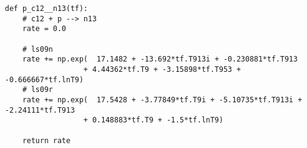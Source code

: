 \documentclass{article}
\begin{document}
\begin{verbatim}
def p_c12__n13(tf):
    # c12 + p --> n13
    rate = 0.0
    
    # ls09n
    rate += np.exp(  17.1482 + -13.692*tf.T913i + -0.230881*tf.T913
                  + 4.44362*tf.T9 + -3.15898*tf.T953 + -0.666667*tf.lnT9)
    # ls09r
    rate += np.exp(  17.5428 + -3.77849*tf.T9i + -5.10735*tf.T913i + -2.24111*tf.T913
                  + 0.148883*tf.T9 + -1.5*tf.lnT9)
    
    return rate
\end{verbatim}
\end{document}
